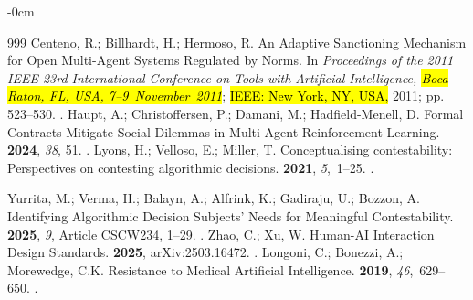 \documentclass[mca,article,accept,pdftex,oneauthor]{Definitions/mdpi}
\begin{document}
\begin{adjustwidth}{-\extralength}{0cm}
\begin{thebibliography}{999}
Centeno, R.; Billhardt, H.; Hermoso, R.
\newblock An Adaptive Sanctioning Mechanism for Open Multi-Agent Systems
  Regulated by Norms.
\newblock In \emph{Proceedings of the 2011 IEEE 23rd International Conference on
  Tools with Artificial Intelligence, \hl{Boca Raton, FL, USA, \mbox{7--9 November 2011}}}; \hl{IEEE: New York, NY, USA,} 2011; pp. 523--530.
.
Haupt, A.; Christoffersen, P.; Damani, M.; Hadfield-Menell, D.
\newblock Formal Contracts Mitigate Social Dilemmas in Multi-Agent
  Reinforcement Learning.
 {\bf 2024}, {\em 38}, 51.
.
Lyons, H.; Velloso, E.; Miller, T.
\newblock Conceptualising contestability: Perspectives on contesting
  algorithmic decisions.
 {\bf
  2021}, {\em 5},~1--25.
.

Yurrita, M.; Verma, H.; Balayn, A.; Alfrink, K.; Gadiraju, U.; Bozzon, A.
\newblock Identifying Algorithmic Decision Subjects' Needs for Meaningful
  Contestability.
 {\bf 2025}, {\em 9}, Article CSCW234, 1--29.
.
Zhao, C.; Xu, W.
\newblock Human-AI Interaction Design Standards.
 {\bf 2025}, arXiv:2503.16472.
.
Longoni, C.; Bonezzi, A.; Morewedge, C.K.
\newblock Resistance to Medical Artificial Intelligence.
 {\bf 2019}, {\em 46},~629--650.
.


\end{thebibliography}
\end{adjustwidth}
\end{document}
